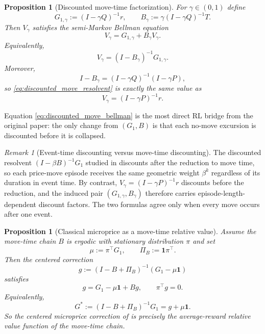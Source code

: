 \documentclass[11pt,twoside]{article}
\theoremstyle{plain}
\newtheorem{proposition}[theorem]{Proposition}
\theoremstyle{definition}
\theoremstyle{remark}
\newtheorem{remark}[theorem]{Remark}
\newcommand{\1}{\mathbf{1}}
\newcommand{\PiB}{\Pi_B}
\begin{document}
\begin{proposition}[Discounted move-time factorization]\label{prop:discounted_move_factorization}
For $\gamma\in(0,1)$ define
\[
G_{1,\gamma}:=(I-\gamma Q)^{-1}r,
\qquad
B_\gamma:=\gamma(I-\gamma Q)^{-1}T.
\]
Then $V_\gamma$ satisfies the semi-Markov Bellman equation
\begin{equation}\label{eq:discounted_move_bellman}
V_\gamma = G_{1,\gamma} + B_\gamma V_\gamma.
\end{equation}
Equivalently,
\begin{equation}\label{eq:discounted_move_resolvent}
V_\gamma=(I-B_\gamma)^{-1}G_{1,\gamma}.
\end{equation}
Moreover,
\begin{equation}\label{eq:discounted_move_identity}
I-B_\gamma=(I-\gamma Q)^{-1}(I-\gamma P),
\end{equation}
so \eqref{eq:discounted_move_resolvent} is exactly the same value as
\begin{equation}\label{eq:discounted_event_resolvent}
V_\gamma=(I-\gamma P)^{-1}r.
\end{equation}
\end{proposition}

Equation \eqref{eq:discounted_move_bellman} is the most direct RL bridge from the original paper: the only change from $(G_1,B)$ is that each no-move excursion is discounted before it is collapsed.

\begin{remark}[Event-time discounting versus move-time discounting]
The discounted resolvent $(I-\beta B)^{-1}G_1$ studied in \cite{Petersen2025} discounts after the reduction to move time, so each price-move episode receives the same geometric weight $\beta^k$ regardless of its duration in event time. By contrast, $V_\gamma=(I-\gamma P)^{-1}r$ discounts before the reduction, and the induced pair $(G_{1,\gamma},B_\gamma)$ therefore carries episode-length-dependent discount factors. The two formulas agree only when every move occurs after one event.
\end{remark}

\begin{proposition}[Classical microprice as a move-time relative value]\label{prop:move_time_relative_value}
Assume the move-time chain $B$ is ergodic with stationary distribution $\pi$ and set
\[
\mu:=\pi^\top G_1,
\qquad
\PiB:=\1\pi^\top.
\]
Then the centered correction
\begin{equation}\label{eq:move_time_relative_value}
g:=(I-B+\PiB)^{-1}(G_1-\mu\1)
\end{equation}
satisfies
\begin{equation}\label{eq:move_time_average_reward_bellman}
g=G_1-\mu\1+Bg,
\qquad
\pi^\top g=0.
\end{equation}
Equivalently,
\[
G^*:=(I-B+\PiB)^{-1}G_1=g+\mu\1.
\]
So the centered microprice correction of \cite{Petersen2025} is precisely the average-reward relative value function of the move-time chain.
\end{proposition}
\end{document}
